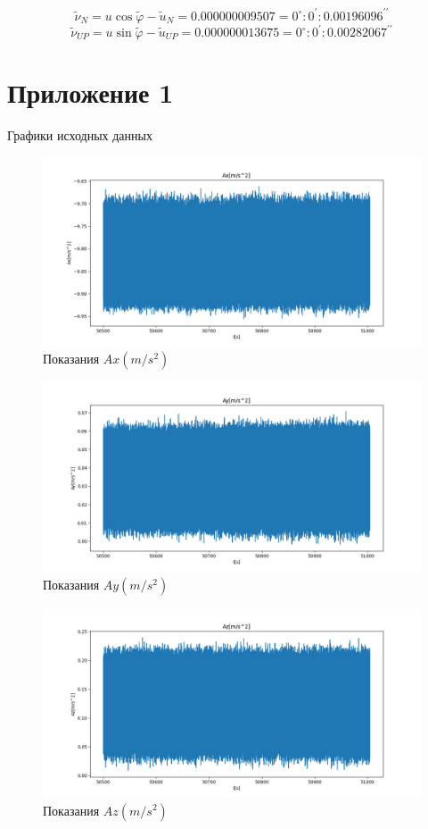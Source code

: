 \documentclass[a4paper,14pt]{article}
\theoremstyle{plain} %
\theoremstyle{definition} %
\theoremstyle{remark} %
\begin{document}
{$$
    \widetilde{\nu}_{N}=u \cos \widetilde{\varphi}-\widetilde{u}_{N}=0.000000009507=0^{\circ}: 0^{\prime}: 0.00196096^{\prime \prime}
$$
$$
    \widetilde{\nu}_{U P}=u \sin \widetilde{\varphi}-\widetilde{u}_{U P}=0.000000013675=0^{\circ}: 0^{\prime}: 0.00282067^{\prime \prime}
$$

\section{Приложение 1}
Графики исходных данных

\begin{figure}[h!]
    \centering
    \includegraphics[width=0.99\linewidth]{Ax.png}
    \caption{Показания $Ax(m/s^2)$}
    \label{fig:ax}
\end{figure}

\begin{figure}[h!]
    \centering
    \includegraphics[width=0.99\linewidth]{Ay.png}
    \caption{Показания $Ay(m/s^2)$}
    \label{fig:ay}
\end{figure}

\begin{figure}[h!]
    \centering
    \includegraphics[width=0.99\linewidth]{Az.png}
    \caption{Показания $Az(m/s^2)$}
    \label{fig:az}
\end{figure}

}
\end{document}
